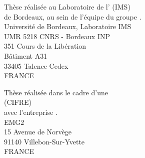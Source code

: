 \thispagestyle{empty}

\vspace*{\fill}

\begin{center}
	Thèse réalisée au Laboratoire de l' (IMS)\\
	de Bordeaux, au sein de l'équipe  du groupe .\\
	\vspace*{1em}
	Université de Bordeaux, Laboratoire IMS\\
	UMR 5218 CNRS - Bordeaux INP\\
	351 Cours de la Libération\\
	Bâtiment A31\\
	33405 Talence Cedex\\
	FRANCE\\
	\vspace*{2em}

	Thèse réalisée dans le cadre d'une \\\mbox{} (CIFRE)\\ avec l'entreprise .\\
	\vspace*{1em}
	EMG2\\
	15 Avenue de Norvège\\
	91140 Villebon-Sur-Yvette\\
	FRANCE\\
	\vspace*{2em}

\end{center}